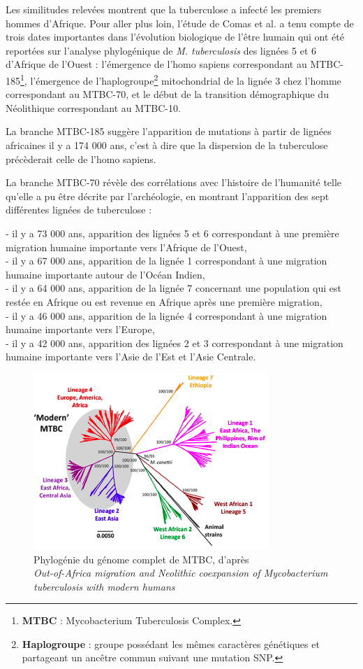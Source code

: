 \documentclass[twoside,a4paper,11pt,frenchb,openany]{report}
\begin{document}
Les similitudes relevées montrent que la tuberculose a infecté les premiers hommes d'Afrique. Pour aller plus loin, l'étude de Comas et al. a tenu compte de trois dates importantes dans l'évolution biologique de l'être humain qui ont été reportées sur l'analyse phylogénique de \textit{M. tuberculosis} des lignées 5 et 6 d'Afrique de l'Ouest : l'émergence de l'homo sapiens correspondant au MTBC-185\footnote{\textbf{MTBC} : Mycobacterium Tuberculosis Complex.}, l'émergence de l'haplogroupe\footnote{\textbf{Haplogroupe} : groupe possédant les mêmes caractères génétiques et partageant un ancêtre commun suivant une mutation SNP.} mitochondrial de la lignée 3 chez l'homme correspondant au MTBC-70, et le début de la transition démographique du Néolithique correspondant au MTBC-10.

La branche MTBC-185 suggère l'apparition de mutations à partir de lignées africaines il y a 174 000 ans, c'est à dire que la dispersion de la tuberculose précèderait celle de l'homo sapiens.

La branche MTBC-70 révèle des corrélations avec l'histoire de l'humanité telle qu'elle a pu être décrite par l'archéologie, en montrant l'apparition des sept différentes lignées de tuberculose :

- il y a 73 000 ans, apparition des lignées 5 et 6 correspondant à une première migration humaine importante vers l'Afrique de l'Ouest,\\
- il y a 67 000 ans, apparition de la lignée 1 correspondant à une migration humaine importante autour de l'Océan Indien,\\
- il y a 64 000 ans, apparition de la lignée 7 concernant une population qui est restée en Afrique ou est revenue en Afrique après une première migration,\\
- il y a 46 000 ans, apparition de la lignée 4 correspondant à une migration humaine importante vers l'Europe,\\
- il y a 42 000 ans, apparition des lignées 2 et 3 correspondant à une migration humaine importante vers l'Asie de l'Est et l'Asie Centrale. 

\begin{figure}[h!]
\centering
\includegraphics[scale=0.7]{worldlignee.png}
\caption{Phylogénie du génome complet de MTBC, d'après\\ \textit{Out-of-Africa migration and Neolithic coexpansion of Mycobacterium\\tuberculosis with modern humans}}
\end{figure}
\end{document}
